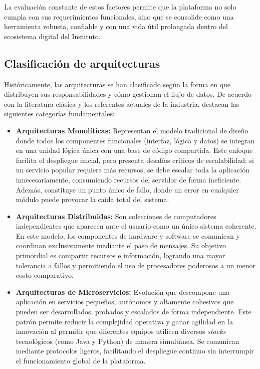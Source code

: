 La evaluación constante de estos factores permite que la plataforma no solo cumpla con sus requerimientos funcionales, sino que se consolide como una herramienta robusta, confiable y con una vida útil prolongada dentro del ecosistema digital del Instituto.

\subsection{Clasificación de arquitecturas}

Históricamente, las arquitecturas se han clasificado según la forma en que distribuyen sus responsabilidades y cómo gestionan el flujo de datos. De acuerdo con la literatura clásica y los referentes actuales de la industria, destacan las siguientes categorías fundamentales:

\begin{itemize}
\item \textbf{Arquitecturas Monolíticas:} Representan el modelo tradicional de diseño donde todos los componentes funcionales (interfaz, lógica y datos) se integran en una unidad lógica única con una base de código compartida. Este enfoque facilita el despliegue inicial, pero presenta desafíos críticos de escalabilidad: si un servicio popular requiere más recursos, se debe escalar toda la aplicación innecesariamente, consumiendo recursos del servidor de forma ineficiente. Además, constituye un punto único de fallo, donde un error en cualquier módulo puede provocar la caída total del sistema.

\item \textbf{Arquitecturas Distribuidas:} Son colecciones de computadores independientes que aparecen ante el usuario como un único sistema coherente. En este modelo, los componentes de hardware y software se comunican y coordinan exclusivamente mediante el paso de mensajes. Su objetivo primordial es compartir recursos e información, logrando una mayor tolerancia a fallos y permitiendo el uso de procesadores poderosos a un menor costo comparativo.

\item \textbf{Arquitecturas de Microservicios:} Evolución que descompone una aplicación en servicios pequeños, autónomos y altamente cohesivos que pueden ser desarrollados, probados y escalados de forma independiente. Este patrón permite reducir la complejidad operativa y ganar agilidad en la innovación al permitir que diferentes equipos utilicen diversos \textit{stacks} tecnológicos (como Java y Python) de manera simultánea. Se comunican mediante protocolos ligeros, facilitando el despliegue continuo sin interrumpir el funcionamiento global de la plataforma.


\end{itemize}
